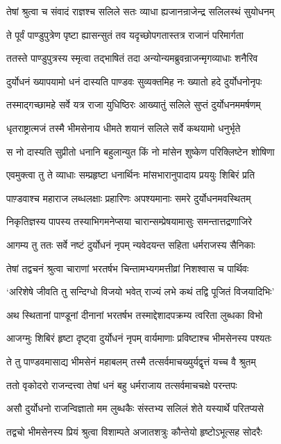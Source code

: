 \twolineshloka
{तेषां श्रुत्वा च संवादं राज्ञश्च सलिले सतः}
{व्याधा ह्यजानन्राजेन्द्र सलिलस्थं सुयोधनम्}


\twolineshloka
{ते पूर्वं पाण्डुपुत्रेण पृष्टा ह्यासन्सुतं तव}
{यदृच्छोपगतास्तत्र राजानं परिमार्गता}


\twolineshloka
{ततस्ते पाण्डुपुत्रस्य स्मृत्वा तद्भाषितं तदा}
{अन्योन्यमब्रुवन्राजन्मृगव्याधाः शनैरिव}


\twolineshloka
{दुर्योधनं ख्यापयामो धनं दास्यति पाण्डवः}
{सुव्यक्तमिह नः ख्यातो हदे दुर्योधनोनृपः}


\twolineshloka
{तस्माद्गच्छामहे सर्वे यत्र राजा युधिष्ठिरः}
{आख्यातुं सलिले सुप्तं दुर्योधनममर्षणम्}


\twolineshloka
{धृतराष्ट्रात्मजं तस्मै भीमसेनाय धीमते}
{शयानं सलिले सर्वे कथयामो धनुर्भृते}


\twolineshloka
{स नो दास्यति सुप्रीतो धनानि बहुलान्युत}
{किं नो मांसेन शुष्केण परिक्लिष्टेन शोषिणा}


\twolineshloka
{एवमुक्त्वा तु ते व्याधाः सम्प्रहृष्टा धनार्थिनः}
{मांसभारानुपादाय प्रययुः शिबिरं प्रति}


\twolineshloka
{पाण़्डवाश्च महाराज लब्धलक्षाः प्रहारिणः}
{अपश्यमानाः समरे दुर्योधनमवस्थितम्}


\twolineshloka
{निकृतिज्ञस्य पापस्य तस्याभिगमनेप्सया}
{चारान्सम्प्रेषयामासुः समन्तात्तद्रणाजिरे}


\twolineshloka
{आगम्य तु ततः सर्वे नष्टं दुर्योधनं नृपम्}
{न्यवेदयन्त सहिता धर्मराजस्य सैनिकाः}


\twolineshloka
{तेषां तद्वचनं श्रुत्वा चाराणां भरतर्षभ}
{चिन्तामभ्यगमत्तीव्रां निशश्वास च पार्थिवः}


\twolineshloka
{`अरिशेषे जीवति तु सन्दिग्धो विजयो भवेत्}
{राज्यं लभे कथं तद्वि पूजितं विजयादिभिः'}


\twolineshloka
{अथ स्थितानां पाण्डूनां दीनानां भरतर्षभ}
{तस्माद्देशादपक्रम्य त्वरिता लुब्धका विभो}


\twolineshloka
{आजग्मुः शिबिरं हृष्टा दृष्ट्वा दुर्योधनं नृपम्}
{वार्यमाणाः प्रविष्टाश्च भीमसेनस्य पश्यतः}


\twolineshloka
{ते तु पाण्डवमासाद्य भीमसेनं महाबलम्}
{तस्मै तत्सर्वमाचख्युर्यद्वृत्तं यच्च वै श्रुतम्}


\twolineshloka
{ततो वृकोदरो राजन्दत्त्वा तेषां धनं बहु}
{धर्मराजाय तत्सर्वमाचचक्षे परन्तपः}


\twolineshloka
{असौ दुर्योधनो राजन्विज्ञातो मम लुब्धकैः}
{संस्तभ्य सलिलं शेते यस्यार्थे परितप्यसे}


\twolineshloka
{तद्वचो भीमसेनस्य प्रियं श्रुत्वा विशाम्पते}
{अजातशत्रुः कौन्तेयो हृष्टोऽभूत्सह सोदरैः}


